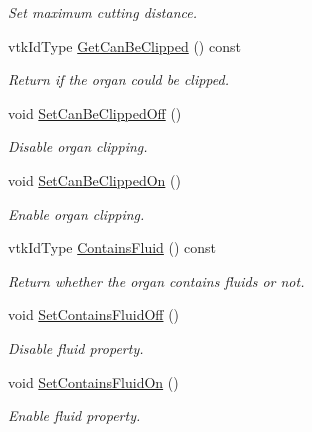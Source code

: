 \begin{DoxyCompactItemize}
\begin{DoxyCompactList}\small\item\em Set maximum cutting distance. \item\end{DoxyCompactList}\item 
vtkIdType \hyperlink{classvtkOrgan_a3a20226df6f6df2a83b2ee0be190c452}{GetCanBeClipped} () const 
\begin{DoxyCompactList}\small\item\em Return if the organ could be clipped. \item\end{DoxyCompactList}\item 
void \hyperlink{classvtkOrgan_a6faee69d6495879b5f545bf1446dd304}{SetCanBeClippedOff} ()
\begin{DoxyCompactList}\small\item\em Disable organ clipping. \item\end{DoxyCompactList}\item 
void \hyperlink{classvtkOrgan_a65da602da9636309dcfa094b537a9fef}{SetCanBeClippedOn} ()
\begin{DoxyCompactList}\small\item\em Enable organ clipping. \item\end{DoxyCompactList}\item 
vtkIdType \hyperlink{classvtkOrgan_a180c5871366dca3c20ec81235ad0f618}{ContainsFluid} () const 
\begin{DoxyCompactList}\small\item\em Return whether the organ contains fluids or not. \item\end{DoxyCompactList}\item 
void \hyperlink{classvtkOrgan_a387870655644666d7e337071ebca3708}{SetContainsFluidOff} ()
\begin{DoxyCompactList}\small\item\em Disable fluid property. \item\end{DoxyCompactList}\item 
void \hyperlink{classvtkOrgan_a776239497bc5ca06cdea73d5dd572000}{SetContainsFluidOn} ()
\begin{DoxyCompactList}\small\item\em Enable fluid property. \item\end{DoxyCompactList}\item 

\end{DoxyCompactItemize}
